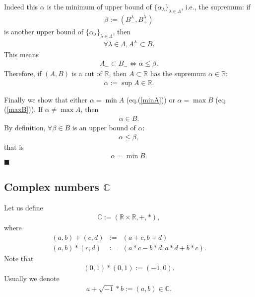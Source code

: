 \documentclass[11pt]{book}
\begin{document}
Indeed this $\alpha$ is the minimum of upper bound of $\{\alpha_\lambda\}_{\lambda \in \Lambda}$, i.e., the supremum: if 
\begin{eqnarray}
\beta := (B^\lambda_-, B^\lambda_+)
\end{eqnarray}
is another upper bound of $\{\alpha_\lambda\}_{\lambda \in \Lambda}$, then 
\begin{eqnarray}
\forall \lambda \in \Lambda, A^\lambda_- \subset B.
\end{eqnarray}
This means
\begin{eqnarray}
A_- \subset B_- \Leftrightarrow \alpha \leq \beta.
\end{eqnarray}
Therefore, if $(A,B)$ is a cut of $\mathbb{R}$, then $A \subset \mathbb{R}$ has the supremum $\alpha \in \mathbb{R}$:
\begin{eqnarray}
\alpha := \sup A \in \mathbb{R}.
\end{eqnarray}

Finally we show that either $\alpha = \min A$ (eq.(\ref{minA})) or $\alpha = \max B$ (eq.(\ref{maxB})).
If $\alpha \neq \max A$, then
\begin{eqnarray}
\alpha \in B.
\end{eqnarray}
By definition, $\forall \beta \in B$ is an upper bound of $\alpha$:
\begin{eqnarray}
\alpha \leq \beta,
\end{eqnarray}
that is
\begin{eqnarray}
\alpha = \min B.
\end{eqnarray}
$\blacksquare$

\subsection{Complex numbers $\mathbb{C}$}
Let us define
\begin{eqnarray}
\mathbb{C} := (\mathbb{R}\times \mathbb{R}, +, *),
\end{eqnarray}
where
\begin{eqnarray}
(a,b) + (c,d) &:=& (a+c, b+d) \\
(a,b) * (c,d) &:=& (a*c - b* d, a*d + b*c).
\end{eqnarray}
Note that
\begin{eqnarray}
(0,1) * (0,1) := (-1,0).
\end{eqnarray}
Usually we denote
\begin{eqnarray}
a + \sqrt{-1} * b := (a,b) \in \mathbb{C}.
\end{eqnarray}
\end{document}
